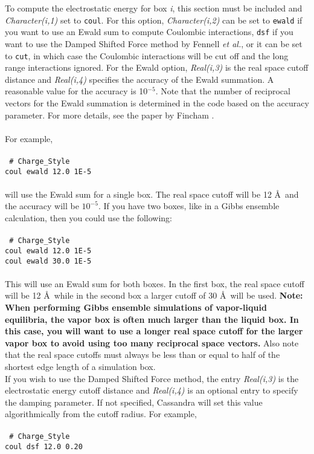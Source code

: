 To compute the electrostatic energy for box {\em i},
this section must be included and {\it Character(i,1)} set to \texttt{coul}.
For this option,
{\it Character(i,2)} can be set to \texttt{ewald} if you want to use
an Ewald sum to compute Coulombic interactions, \texttt{dsf} if you want to use
the Damped Shifted Force method by Fennell \textit{et al.}\cite{Fennell:2006}, or it can be set to
\texttt{cut}, in which case the Coulombic interactions will be cut off and
the long range interactions ignored. For the Ewald option,
{\it Real(i,3)} is the real space cutoff distance and {\it Real(i,4)}
specifies the accuracy of the Ewald summation. A reasonable value for
the accuracy is 10$^{-5}$. Note that the number of reciprocal vectors
for the Ewald summation is determined in the code based on the
accuracy parameter. For more details, see the paper by Fincham
\cite{Fincham:1994}.\\ \\
%
For example,
\\ \\
\texttt{
\# Charge\_Style \\
coul ewald 12.0 1E-5}\\ \\
will use the Ewald sum for a single box. The real space cutoff will be
12 \AA\ and the accuracy will be $10^{-5}$. If you have two boxes,
like in a Gibbs ensemble calculation, then you could use the
following:
\\ \\
\texttt{
\# Charge\_Style \\
coul ewald 12.0 1E-5\\
coul ewald 30.0 1E-5}
\\ \\
This will use an Ewald sum for both boxes. In the first box, the real
space cutoff will be 12 \AA\ while in the second box a larger cutoff
of 30 \AA\ will be used. {\bf Note: When performing Gibbs ensemble
simulations of vapor-liquid equilibria, the vapor box is often much
larger than the liquid box. In this case, you will want to use a
longer real space cutoff for the larger vapor box to avoid using too
many reciprocal space vectors.} Also note that the real space
cutoffs must always be less than or equal to half of the shortest edge
length of a simulation box. \\

If you wish to use the Damped Shifted Force method, the entry {\it Real(i,3)}
is the electrostatic energy cutoff distance and {\it Real(i,4)} is an optional
entry to specify the damping parameter. If not specified, Cassandra will
set this value algorithmically from the cutoff radius. For example,
\\ \\
\texttt{
\# Charge\_Style \\
coul dsf 12.0 0.20}\\

